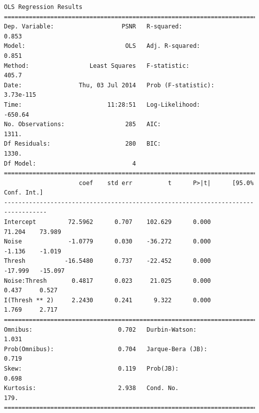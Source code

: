 \documentclass[11pt]{article}
\theoremstyle{definition}
\begin{document}
{\begin{lstlisting}[caption = Time Series 2 - Wavelet Coefficient Thresholding OLS Model, label = {waveletfilterseries2}]
                            OLS Regression Results                            
==============================================================================
Dep. Variable:                   PSNR   R-squared:                       0.853
Model:                            OLS   Adj. R-squared:                  0.851
Method:                 Least Squares   F-statistic:                     405.7
Date:                Thu, 03 Jul 2014   Prob (F-statistic):          3.73e-115
Time:                        11:28:51   Log-Likelihood:                -650.64
No. Observations:                 285   AIC:                             1311.
Df Residuals:                     280   BIC:                             1330.
Df Model:                           4                                         
==================================================================================
                     coef    std err          t      P>|t|      [95.0% Conf. Int.]
----------------------------------------------------------------------------------
Intercept         72.5962      0.707    102.629      0.000        71.204    73.989
Noise             -1.0779      0.030    -36.272      0.000        -1.136    -1.019
Thresh           -16.5480      0.737    -22.452      0.000       -17.999   -15.097
Noise:Thresh       0.4817      0.023     21.025      0.000         0.437     0.527
I(Thresh ** 2)     2.2430      0.241      9.322      0.000         1.769     2.717
==============================================================================
Omnibus:                        0.702   Durbin-Watson:                   1.031
Prob(Omnibus):                  0.704   Jarque-Bera (JB):                0.719
Skew:                           0.119   Prob(JB):                        0.698
Kurtosis:                       2.938   Cond. No.                         179.
==============================================================================
\end{lstlisting}

}
\end{document}
